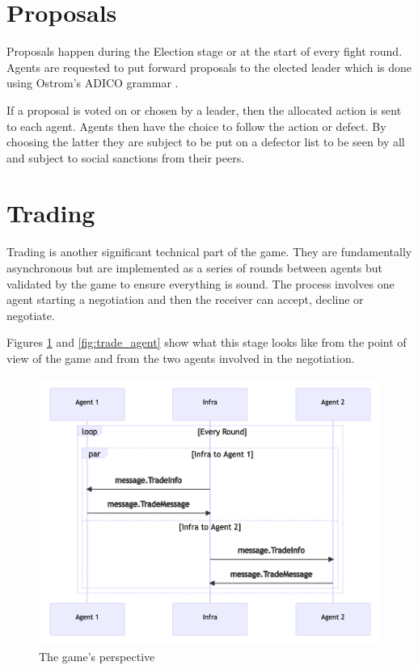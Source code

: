 \section{Proposals}
Proposals happen during the Election stage or at the start of every fight round. Agents are requested to put forward proposals to the elected leader which is done using Ostrom's ADICO grammar \cite{OstromADICO}.

If a proposal is voted on or chosen by a leader, then the allocated action is sent to each agent. Agents then have the choice to follow the action or defect. By choosing the latter they are subject to be put on a defector list to be seen by all and subject to social sanctions from their peers.

\section{Trading}
Trading is another significant technical part of the game. They are fundamentally asynchronous but are implemented as a series of rounds between agents but validated by the game to ensure everything is sound. The process involves one agent starting a negotiation and then the receiver can accept, decline or negotiate.

Figures \ref{fig:trade_game} and \ref{fig:trade_agent} show what this stage looks like from the point of view of the game and from the two agents involved in the negotiation.

\begin{figure}[htb]
    \centering
    \includegraphics{003_infrastructure/images/trade1.png}
    \caption{The game's perspective}
    \label{fig:trade_game}
\end{figure}

